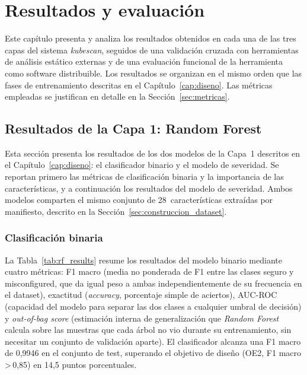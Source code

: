 \chapter{Resultados y evaluación}
\label{cap:resultados}

Este capítulo presenta y analiza los resultados obtenidos en cada una de las tres
capas del sistema \textit{kubescan}, seguidos de una validación cruzada con
herramientas de análisis estático externas y de una evaluación funcional de la
herramienta como software distribuible. Los resultados se organizan en el mismo
orden que las fases de entrenamiento descritas en el Capítulo~\ref{cap:diseno}. Las
métricas empleadas se justifican en detalle en la Sección~\ref{sec:metricas}.

\section{Resultados de la Capa 1: Random Forest}

Esta sección presenta los resultados de los dos modelos de la Capa~1 descritos en
el Capítulo~\ref{cap:diseno}: el clasificador binario y el modelo de severidad. Se
reportan primero las métricas de clasificación binaria y la importancia de las
características, y a continuación los resultados del modelo de severidad. Ambos
modelos comparten el mismo conjunto de 28~características extraídas por
manifiesto, descrito en la Sección~\ref{sec:construccion_dataset}.

\subsection{Clasificación binaria}

La Tabla~\ref{tab:rf_results} resume los resultados del modelo binario mediante
cuatro métricas: F1 macro (media no ponderada de F1 entre las clases seguro y
misconfigured, que da igual peso a ambas independientemente de su frecuencia en el
dataset), exactitud (\textit{accuracy}, porcentaje simple de aciertos), \ac{AUC}-\ac{ROC}
(capacidad del modelo para separar las dos clases a cualquier umbral de decisión) y
\textit{out-of-bag score} (estimación interna de generalización que
\textit{Random Forest} calcula sobre las muestras que cada árbol no vio durante su
entrenamiento, sin necesitar un conjunto de validación aparte). El clasificador
alcanza una F1 macro de 0,9946 en el conjunto de test, superando el objetivo de
diseño (OE2, F1 macro\,>\,0,85) en 14,5 puntos porcentuales.

